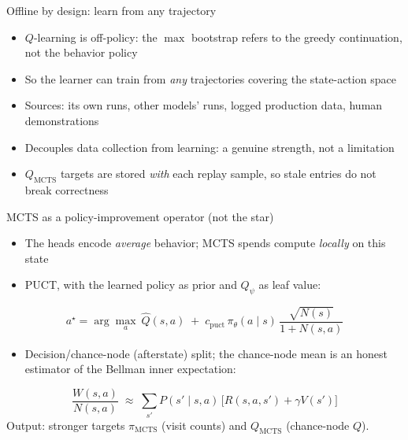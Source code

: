 \documentclass[aspectratio=169]{beamer}
\newcommand{\pitheta}{\pi_\theta}
\newcommand{\Qpsi}{Q_\psi}
\newcommand{\piMCTS}{\pi_{\mathrm{MCTS}}}
\newcommand{\QMCTS}{Q_{\mathrm{MCTS}}}
\begin{document}
\begin{frame}{Offline by design: learn from any trajectory}
  \begin{itemize}
    \item $Q$-learning is \alert{off-policy}: the $\max$ bootstrap refers to the greedy continuation, not the behavior policy
    \item So the learner can train from \emph{any} trajectories covering the state-action space
    \item Sources: its own runs, other models' runs, logged production data, human demonstrations
    \item Decouples data collection from learning: a genuine strength, not a limitation
    \item $\QMCTS$ targets are stored \emph{with} each replay sample, so stale entries do not break correctness
  \end{itemize}
\end{frame}

\begin{frame}{MCTS as a policy-improvement operator (not the star)}
  \begin{itemize}
    \item The heads encode \emph{average} behavior; MCTS spends compute \emph{locally} on this state
    \item PUCT, with the learned policy as prior and $\Qpsi$ as leaf value:
  \end{itemize}
  \[
    a^\star = \arg\max_a\ \widehat{Q}(s,a) \;+\; c_{\mathrm{puct}}\, \pitheta(a\mid s)\,
      \frac{\sqrt{N(s)}}{1 + N(s,a)}
  \]
  \begin{itemize}
    \item Decision/chance-node (afterstate) split; the chance-node mean is an honest estimator of the Bellman inner expectation:
  \end{itemize}
  \[
    \frac{W(s,a)}{N(s,a)} \;\approx\; \sum_{s'} P(s'\mid s,a)\,\bigl[R(s,a,s') + \gamma V(s')\bigr]
  \]
  \centering Output: stronger targets \;$\piMCTS$\; (visit counts) and \;$\QMCTS$\; (chance-node $Q$).
\end{frame}
\end{document}

